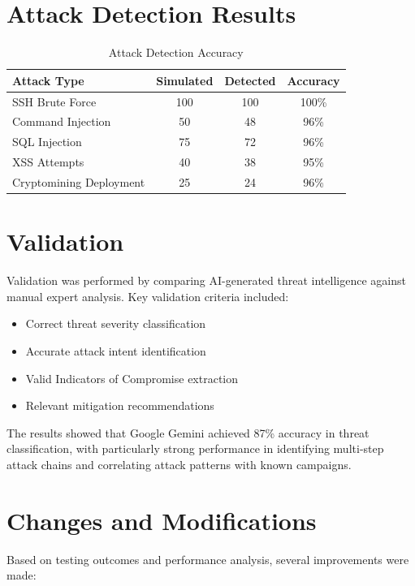 \documentclass[12pt,a4paper]{report}
\begin{document}
\section{Attack Detection Results}

\begin{table}[h]
\centering
\caption{Attack Detection Accuracy}
\label{tab:attack_detection}
\begin{tabular}{|l|c|c|c|}
\hline
\textbf{Attack Type} & \textbf{Simulated} & \textbf{Detected} & \textbf{Accuracy} \\
\hline
SSH Brute Force & 100 & 100 & 100\% \\
\hline
Command Injection & 50 & 48 & 96\% \\
\hline
SQL Injection & 75 & 72 & 96\% \\
\hline
XSS Attempts & 40 & 38 & 95\% \\
\hline
Cryptomining Deployment & 25 & 24 & 96\% \\
\hline
\end{tabular}
\end{table}

\section{Validation}

Validation was performed by comparing AI-generated threat intelligence against manual expert analysis. Key validation criteria included:

\begin{itemize}
\item Correct threat severity classification
\item Accurate attack intent identification
\item Valid Indicators of Compromise extraction
\item Relevant mitigation recommendations
\end{itemize}

The results showed that Google Gemini achieved 87\% accuracy in threat classification, with particularly strong performance in identifying multi-step attack chains and correlating attack patterns with known campaigns.

\section{Changes and Modifications}

Based on testing outcomes and performance analysis, several improvements were made:
\end{document}
